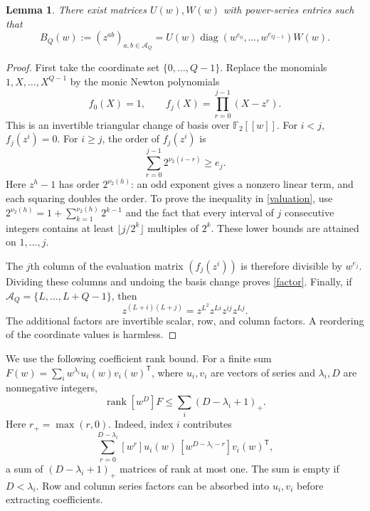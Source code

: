 \documentclass[12pt,a4paper]{article}
\newtheorem{lemma}[theorem]{Lemma}
\newcommand{\F}{\mathbb F_2}
\newcommand{\rank}{\operatorname{rank}}
\begin{document}
\begin{lemma}\label{newton}
There exist matrices $U(w),W(w)$ with power-series entries such that
\begin{equation}\label{factor}
B_Q(w):=(z^{ab})_{a,b\in\mathcal A_Q}
=U(w)\operatorname{diag}(w^{e_0},\ldots,w^{e_{Q-1}})W(w).
\end{equation}
\end{lemma}
\begin{proof}
First take the coordinate set $\{0,\ldots,Q-1\}$. Replace the monomials $1,X,\ldots,X^{Q-1}$ by the monic Newton polynomials
\[
f_0(X)=1,\qquad f_j(X)=\prod_{r=0}^{j-1}(X-z^r).
\]
This is an invertible triangular change of basis over $\F[[w]]$.
For $i<j$, $f_j(z^i)=0$. For $i\ge j$, the order of $f_j(z^i)$ is
\begin{equation}\label{valuation}
\sum_{r=0}^{j-1}2^{\nu_2(i-r)}\ge e_j.
\end{equation}
Here $z^h-1$ has order $2^{\nu_2(h)}$: an odd exponent gives a nonzero linear term, and each squaring doubles the order. To prove the inequality in \eqref{valuation}, use
$2^{\nu_2(h)}=1+\sum_{k=1}^{\nu_2(h)}2^{k-1}$ and the fact that every interval of $j$ consecutive integers contains at least $\lfloor j/2^k\rfloor$ multiples of $2^k$. These lower bounds are attained on $1,\ldots,j$.

The $j$th column of the evaluation matrix $(f_j(z^i))$ is therefore divisible by $w^{e_j}$. Dividing these columns and undoing the basis change proves \eqref{factor}. Finally, if $\mathcal A_Q=\{L,\ldots,L+Q-1\}$, then
\[
z^{(L+i)(L+j)}=z^{L^2}z^{Li}z^{ij}z^{Lj}.
\]
The additional factors are invertible scalar, row, and column factors. A reordering of the coordinate values is harmless.
\end{proof}

We use the following coefficient rank bound. For a finite sum $F(w)=\sum_i w^{\lambda_i}u_i(w)v_i(w)^{\mathsf T}$, where $u_i,v_i$ are vectors of series and $\lambda_i,D$ are nonnegative integers,
\begin{equation}\label{rankcoeff}
\rank[w^D]F\le\sum_i(D-\lambda_i+1)_+.
\end{equation}
Here $r_+=\max(r,0)$. Indeed, index $i$ contributes
\[
\sum_{r=0}^{D-\lambda_i}[w^r]u_i(w)\,[w^{D-\lambda_i-r}]v_i(w)^{\mathsf T},
\]
a sum of $(D-\lambda_i+1)_+$ matrices of rank at most one. The sum is empty if $D<\lambda_i$. Row and column series factors can be absorbed into $u_i,v_i$ before extracting coefficients.
\end{document}

